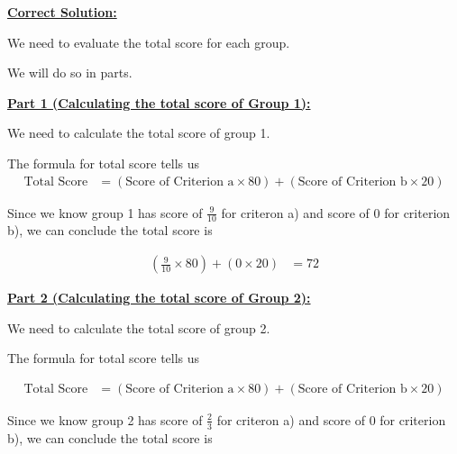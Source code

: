 \documentclass[12pt]{article}
\begin{document}
\begin{mdframed}
    \underline{\textbf{Correct Solution:}}

    \bigskip

    We need to evaluate the total score for each group.

    \bigskip

    We will do so in parts.

    \bigskip

    \underline{\textbf{Part 1 (Calculating the total score of Group 1):}}

    \bigskip

    We need to calculate the total score of group 1.

    \bigskip

    \color{red}
    The formula for total score tells us
    \setcounter{equation}{0}
    \begin{align}
        \text{Total Score} &= (\text{Score of Criterion a} \times 80) + (\text{Score of Criterion b} \times 20)
    \end{align}
    \color{black}

    \bigskip

    Since we know \color{red}group 1 has score of $\frac{9}{10}$ for criteron a) and score of $0$ for
    criterion b)\color{black}, we can conclude the total score is

    \color{red}
    \begin{align}
        (\frac{9}{10} \times 80) + (0 \times 20) &= 72
    \end{align}
    \color{black}

    \bigskip

    \underline{\textbf{Part 2 (Calculating the total score of Group 2):}}

    \bigskip

    We need to calculate the total score of group 2.

    \bigskip

    \color{red}
    The formula for total score tells us

    \begin{align}
        \text{Total Score} &= (\text{Score of Criterion a} \times 80) + (\text{Score of Criterion b} \times 20)
    \end{align}
    \color{black}

    \bigskip

    Since we know \color{red}group 2 has score of $\frac{2}{3}$ for criteron a) and score of $0$ for
    criterion b)\color{black}, we can conclude the total score is


\end{mdframed}
\end{document}
